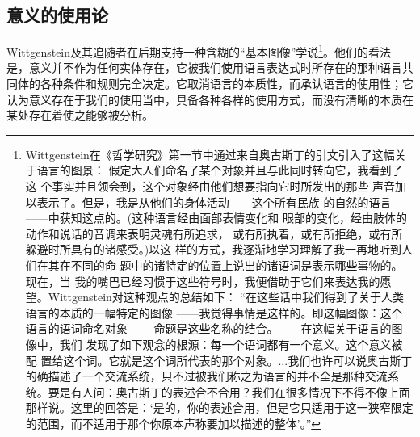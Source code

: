 \documentclass{article}
\begin{document}
\subsection{意义的使用论}
Wittgenstein及其追随者在后期支持一种含糊的“基本图像”学说\footnote{Wittgenstein在《哲学研究》第一节中通过来自奥古斯丁的引文引入了这幅关于语言的图景： 假定大人们命名了某个对象并且与此同时转向它，我看到了这 个事实并且领会到，这个对象经由他们想要指向它时所发出的那些 声音加以表示了。但是，我是从他们的身体活动——这个所有民族 的自然的语言——中获知这点的。(这种语言经由面部表情变化和 眼部的变化，经由肢体的动作和说话的音调来表明灵魂有所追求， 或有所执着，或有所拒绝，或有所躲避时所具有的诸感受。)以这 样的方式，我逐渐地学习理解了我一再地听到人们在其在不同的命 题中的诸特定的位置上说出的诸语词是表示哪些事物的。现在，当 我的嘴巴已经习惯于这些符号时，我便借助于它们来表达我的愿 望。Wittgenstein对这种观点的总结如下： “在这些话中我们得到了关于人类语言的本质的一幅特定的图像 ——我觉得事情是这样的。即这幅图像：这个语言的语词命名对象 ——命题是这些名称的结合。——在这幅关于语言的图像中，我们 发现了如下观念的根源：每一个语词都有一个意义。这个意义被配 置给这个词。它就是这个词所代表的那个对象。...我们也许可以说奥古斯丁的确描述了一个交流系统，只不过被我们称之为语言的并不全是那种交流系统。要是有人问：奥古斯丁的表述合不合用？我们在很多情况下不得不像上面那样说。这里的回答是：‘是的，你的表述合用，但是它只适用于这一狭窄限定的范围，而不适用于那个你原本声称要加以描述的整体’。”}。他们的看法是，意义并不作为任何实体存在，它被我们使用语言表达式时所存在的那种语言共同体的各种条件和规则完全决定。它取消语言的本质性，而承认语言的使用性；它认为意义存在于我们的使用当中，具备各种各样的使用方式，而没有清晰的本质在某处存在着使之能够被分析。
\end{document}
